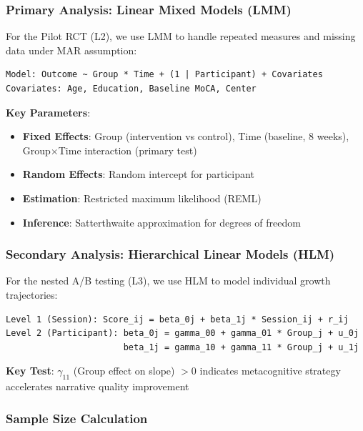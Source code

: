 \documentclass[11pt]{article}
\begin{document}
\subsubsection{Primary Analysis: Linear Mixed Models (LMM)}

For the Pilot RCT (L2), we use LMM to handle repeated measures and missing data under MAR assumption:

\begin{verbatim}
Model: Outcome ~ Group * Time + (1 | Participant) + Covariates
Covariates: Age, Education, Baseline MoCA, Center
\end{verbatim}

\textbf{Key Parameters}:
\begin{itemize}
    \item \textbf{Fixed Effects}: Group (intervention vs control), Time (baseline, 8 weeks), Group$\times$Time interaction (primary test)
    \item \textbf{Random Effects}: Random intercept for participant
    \item \textbf{Estimation}: Restricted maximum likelihood (REML)
    \item \textbf{Inference}: Satterthwaite approximation for degrees of freedom
\end{itemize}

\subsubsection{Secondary Analysis: Hierarchical Linear Models (HLM)}

For the nested A/B testing (L3), we use HLM to model individual growth trajectories:

\begin{verbatim}
Level 1 (Session): Score_ij = beta_0j + beta_1j * Session_ij + r_ij
Level 2 (Participant): beta_0j = gamma_00 + gamma_01 * Group_j + u_0j
                       beta_1j = gamma_10 + gamma_11 * Group_j + u_1j
\end{verbatim}

\textbf{Key Test}: $\gamma_{11}$ (Group effect on slope) $> 0$ indicates metacognitive strategy accelerates narrative quality improvement

\subsubsection{Sample Size Calculation}
\end{document}

